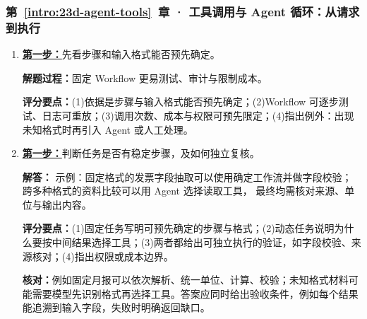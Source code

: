 \subsubsection*{第~\ref*{intro:23d-agent-tools}~章 · 工具调用与 Agent 循环：从请求到执行}
\begin{enumerate}[label={},leftmargin=4.8em,itemsep=4pt]
\item[\textbf{C-101.}] \leavevmode{}\label{solution:C-101}\label{solution:fixed-workflow-audit}\hyperref[exercise:fixed-workflow-audit]{\textbf{第一步：}}先看步骤和输入格式能否预先确定。\par\nobreak\textbf{解题过程：}固定 Workflow 更易测试、审计与限制成本。\par\textbf{评分要点：}(1)依据是步骤与输入格式能否预先确定；(2)Workflow 可逐步测试、日志可重放；(3)调用次数、成本与权限可预先限定；(4)指出例外：出现未知格式时再引入 Agent 或人工处理。
\item[\textbf{C-102.}] \leavevmode{}\label{solution:C-102}\label{solution:workflow-agent-choice}\hyperref[exercise:workflow-agent-choice]{\textbf{第一步：}}判断任务是否有稳定步骤，及如何独立复核。\par\nobreak
\textbf{解答：} 示例：固定格式的发票字段抽取可以使用确定工作流并做字段校验；
跨多种格式的资料比较可以用 Agent 选择读取工具，
最终均需核对来源、单位与输出内容。\par\textbf{评分要点：}(1)固定任务写明可预先确定的步骤与格式；(2)动态任务说明为什么要按中间结果选择工具；(3)两者都给出可独立执行的验证，如字段校验、来源核对；(4)指出权限或成本边界。\par\textbf{核对：}例如固定月报可以依次解析、统一单位、计算、校验；未知格式材料可能需要模型先识别格式再选择工具。答案应同时给出验收条件，例如每个结果能追溯到输入字段，失败时明确返回缺口。
\end{enumerate}
